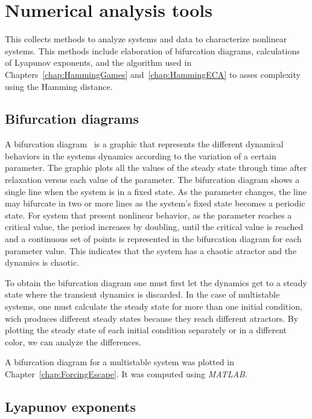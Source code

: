 \section{Numerical analysis tools}

This collects methods to analyze systems and data to characterize nonlinear systems. This methods include elaboration of bifurcation diagrams, calculations of Lyapunov exponents, and the algorithm used in Chapters~\ref{chap:HammingGames} and~\ref{chap:HammingECA} to asses complexity using the Hamming distance.

\subsection{Bifurcation diagrams}

A bifurcation diagram~\cite{Bifurcation} is a graphic that represents the different dynamical behaviors in the systems dynamics according to the variation of a certain parameter. The graphic plots all the values of the steady state through time after relaxation versus each value of the parameter. The bifurcation diagram shows a single line when the system is in a fixed state. As the parameter changes, the line may bifurcate in two or more lines as the system's fixed state becomes a periodic state. For system that present nonlinear behavior, as the parameter reaches a critical value, the period increases by doubling, until the critical value is reached and a continuous set of points is represented in the bifurcation diagram for each parameter value. This indicates that the system has a chaotic atractor and the dynamics is chaotic.

To obtain the bifurcation diagram one must first let the dynamics get to a steady state where the transient dynamics is discarded. In the case of multistable systems, one must calculate the steady state for more than one initial condition, wich produces different steady states because they reach different atractors. By plotting the steady state of each initial condition separately or in a different color, we can analyze the differences. 

A bifurcation diagram for a multistable system was plotted in Chapter~\ref{chap:ForcingEscape}. It was computed using \textit{MATLAB}. 

\subsection{Lyapunov exponents}

